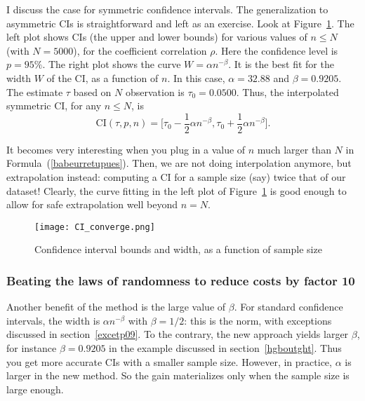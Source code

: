 \documentclass[oneside,10pt]{book}
\begin{document}
I discuss the case for symmetric confidence intervals. The generalization to asymmetric CIs is straightforward and left as an exercise.
Look at Figure~\ref{fig:nogrdf2abcgt43}. The left plot shows CIs (the upper and lower bounds) for various values of $n\leq N$
 (with $N = 5000$), for the
 coefficient correlation $\rho$. Here the confidence level is $p=95\%$.
The right plot shows the curve $W = \alpha n^{-\beta}$. It is the best fit
 for the width $W$ of the CI, as a function of $n$. In this case, $\alpha = 32.88$ and $\beta = 0.9205$. The estimate
 $\tau$ based on $N$ observation is $\tau_0 = 0.0500$. Thus, the interpolated symmetric CI, for any $n\leq N$, is
\begin{equation}
 \text{CI}(\tau, p, n) = \Big[\tau_0 - \frac{1}{2}\alpha n^{-\beta}, \tau_0 + \frac{1}{2}\alpha n^{-\beta}\Big].\label{babeurretupues}
\end{equation}

It becomes very interesting when you plug in a value of $n$ much larger than $N$ in Formula~(\ref{babeurretupues}). Then,
 we are not doing interpolation anymore, but extrapolation instead: computing a CI for a sample size (say) twice that of our dataset!
 Clearly, the curve fitting in the left plot of Figure~\ref{fig:nogrdf2abcgt43} is good enough to allow for safe extrapolation
 well beyond $n = N$.


\begin{figure}[H]
\centering
\texttt{[image: CI\_converge.png]} %
\caption{Confidence interval bounds and width, as a function of sample size}
\label{fig:nogrdf2abcgt43}
\end{figure}


\subsubsection{Beating the laws of randomness to reduce costs by factor 10}

Another benefit of the method is the large value of $\beta$. For standard confidence intervals, the width is $\alpha n^{-\beta}$
 with $\beta = 1/2$: this is the norm, with exceptions discussed in section~\ref{excetp09}. To the contrary, the new approach yields
 larger $\beta$, for instance $\beta = 0.9205$ in the example discussed in section~\ref{hgboutght}. Thus you get more accurate
 CIs with a smaller sample size. However, in practice, $\alpha$ is larger in the new method. So the gain materializes only when the sample size is large enough.
\end{document}
